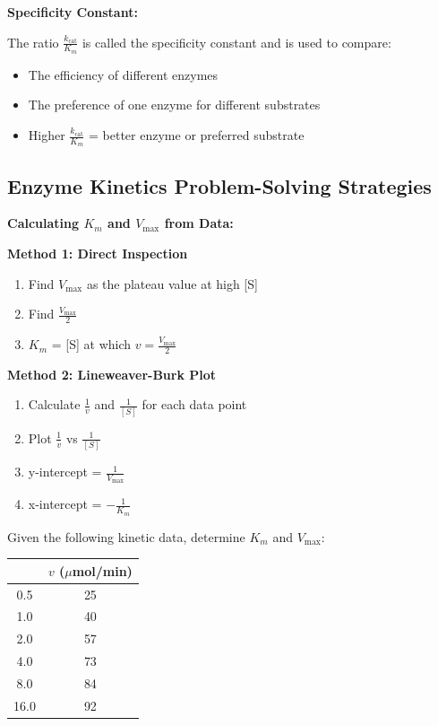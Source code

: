 \begin{theorem}
\textbf{Specificity Constant:}

The ratio $\frac{k_{\text{cat}}}{K_m}$ is called the specificity constant and is used to compare:
\begin{itemize}
    \item The efficiency of different enzymes
    \item The preference of one enzyme for different substrates
    \item Higher $\frac{k_{\text{cat}}}{K_m}$ = better enzyme or preferred substrate
\end{itemize}
\end{theorem}

\subsection{Enzyme Kinetics Problem-Solving Strategies}

\begin{skillbox}
\textbf{Calculating $K_m$ and $V_{\max}$ from Data:}

\textbf{Method 1: Direct Inspection}
\begin{enumerate}
    \item Find $V_{\max}$ as the plateau value at high [S]
    \item Find $\frac{V_{\max}}{2}$
    \item $K_m$ = [S] at which $v = \frac{V_{\max}}{2}$
\end{enumerate}

\textbf{Method 2: Lineweaver-Burk Plot}
\begin{enumerate}
    \item Calculate $\frac{1}{v}$ and $\frac{1}{[S]}$ for each data point
    \item Plot $\frac{1}{v}$ vs $\frac{1}{[S]}$
    \item y-intercept = $\frac{1}{V_{\max}}$
    \item x-intercept = $-\frac{1}{K_m}$
\end{enumerate}
\end{skillbox}

\begin{example}
Given the following kinetic data, determine $K_m$ and $V_{\max}$:

\begin{center}
\begin{tabular}{cc}
\toprule
[S] (mM) & $v$ ($\mu$mol/min) \\
\midrule
0.5 & 25 \\
1.0 & 40 \\
2.0 & 57 \\
4.0 & 73 \\
8.0 & 84 \\
16.0 & 92 \\
\bottomrule
\end{tabular}
\end{center}
\end{example}


